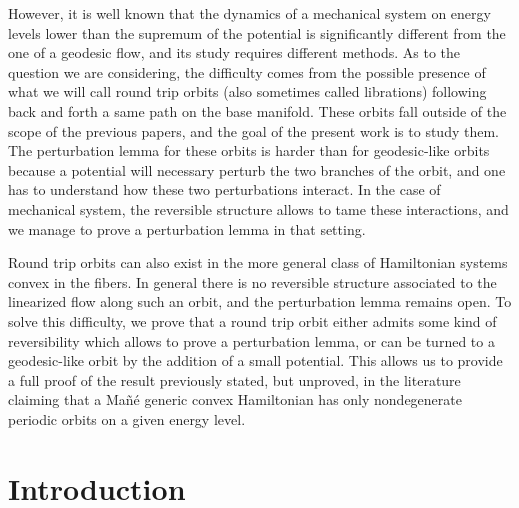 \documentclass[10pt]{amsart}
\theoremstyle{plain}
\theoremstyle{definition}
\begin{document}
However, it is well known that the dynamics of a mechanical system on energy levels lower than the supremum of the potential is
significantly different from the one of a geodesic flow, and its study requires different methods. As to the question we are considering, the difficulty comes from the possible presence of what we will call round trip orbits (also sometimes called librations)
following back and forth a same path on the base manifold.
These orbits fall outside of the scope of the previous papers,
and the goal of the present work is to study them.
The perturbation lemma for these orbits is harder than for geodesic-like orbits because
a potential will necessary perturb the two branches of the orbit, and one has to understand how these two perturbations interact.
In the case of mechanical system, the reversible structure allows to tame these interactions, and we manage to prove a perturbation lemma in that setting.

Round trip orbits can also exist in the more general class of
Hamiltonian systems convex in the fibers. In general there is no reversible structure associated to the linearized flow along such an orbit, and the perturbation lemma remains open.
To solve this difficulty, we prove that a round trip orbit either admits some kind of reversibility which allows to prove a perturbation lemma, or can be turned to a geodesic-like orbit by the addition of a small potential.
This allows us to provide a full proof of the result previously stated, but unproved, in the literature claiming that a Mañé generic convex Hamiltonian has only nondegenerate periodic orbits on a given energy level.

\section{Introduction}
\end{document}
